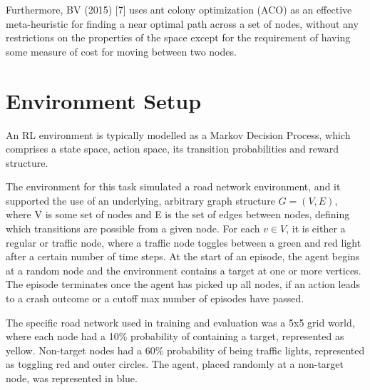 \documentclass{article}
\begin{document}
	Furthermore, BV (2015) [7] uses ant colony optimization (ACO) as an effective meta-heuristic for finding a near optimal path across a set of nodes, without any restrictions on the properties of the space except for the requirement of having some measure of cost for moving between two nodes.
	
	\section{Environment Setup}
	An RL environment is typically modelled as a Markov Decision Process, which comprises a state space, action space, its transition probabilities and reward structure.
	
	The environment for this task simulated a road network environment, and it supported the use of an underlying, arbitrary graph structure $G = (V, E)$, where V is some set of nodes and E is the set of edges between nodes, defining which transitions are possible from a given node. For each $v\in V$, it is either a regular or traffic node, where a traffic node toggles between a green and red light after a certain number of time steps. At the start of an episode, the agent begins at a random node and the environment contains a target at one or more vertices. The episode terminates once the agent has picked up all nodes, if an action leads to a crash outcome or a cutoff max number of episodes have passed.
	
	The specific road network used in training and evaluation was a 5x5 grid world, where each node had a 10\% probability of containing a target, represented as yellow. Non-target nodes had a 60\% probability of being traffic lights, represented as toggling red and outer circles. The agent, placed randomly at a non-target node, was represented in blue.
	
\end{document}
